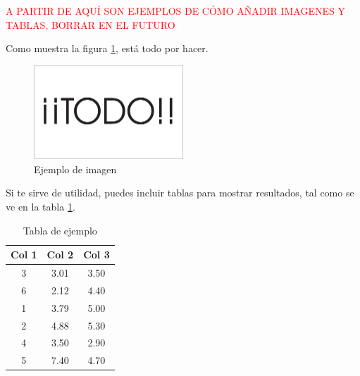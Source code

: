 \textcolor{red}{A PARTIR DE AQUÍ SON EJEMPLOS DE CÓMO AÑADIR IMAGENES Y TABLAS, BORRAR EN EL FUTURO}


Como muestra la figura \ref{fig:sampleImage}, está todo por hacer.

\begin{figure}[h]
	\centering
	\includegraphics[width = 0.5\textwidth]{Imagenes/Vectorial/Todo.pdf}
	\caption{Ejemplo de imagen}
	\label{fig:sampleImage}
\end{figure}

Si te sirve de utilidad,  puedes incluir tablas para mostrar resultados, tal como se ve en la tabla \ref{tab:sampleTable}.


\begin{table}
	\centering
	\begin{tabular}{c|c|c}
		\textbf{Col 1} & \textbf{Col 2} & \textbf{Col 3} \\
		\hline\hline
		3 & 3.01 & 3.50\\
		6 & 2.12 & 4.40\\
		1 & 3.79 & 5.00\\
		2 & 4.88 & 5.30\\
		4 & 3.50 & 2.90\\
		5 & 7.40 & 4.70\\
		\hline
	\end{tabular}
	\caption{Tabla de ejemplo}
	\label{tab:sampleTable}
\end{table}
